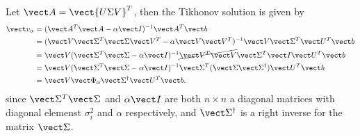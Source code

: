\documentclass{homework}
\begin{document}
\begin{longproblem}
\begin{solution}
  Let $\vect A = \vect{U\Sigma V}^T$, then the Tikhonov solution is given by
  \begin{align*}
  \vect v_\alpha 
  &= (\vect A^T \vect A - \alpha \vect I)^{-1} \vect A^T \vect b\\
  &= (\vect V \vect \Sigma^T\vect \Sigma \vect V^T - \alpha \vect V\vect V^T)^{-1} \vect V\vect \Sigma^T \vect U^T \vect b\\
  &= \vect V (\vect \Sigma^T\vect \Sigma  - \alpha \vect I)^{-1}\cancel{\vect V^T \vect V}\vect \Sigma^T\vect I \vect U^T \vect b\\
  &= \vect V (\vect \Sigma^T\vect \Sigma  - \alpha \vect I)^{-1}\vect\Sigma^T (\vect\Sigma \vect \Sigma^\dagger) \vect U^T \vect b\\
  &= \vect V \vect \Phi_{\alpha} \vect \Sigma^\dagger\vect U^T \vect b.\\
  \end{align*}
  since $\vect \Sigma^T\vect \Sigma$ and  $\alpha \vect I$ are both $n\times n$ a diagonal matrices with diagonal elemenst $\sigma_i^2$ and $\alpha$ respectively, and $\vect \Sigma^\dagger$ is a right inverse for the matrix $\vect \Sigma$. 
  \end{solution}
\end{longproblem}
\end{document}
